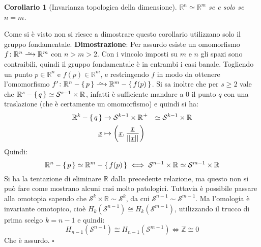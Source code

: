 \documentclass[10pt, twoside=false, x11names]{scrbook}
\newtheorem{corollary}[theorem]{Corollario}
\newenvironment{proof}{{\textbf{Dimostrazione}:}}{\hfill $\square$}
\newcommand{\Z}{\mathbb{Z}}
\newcommand{\RN}[1][]{\mathbb{R}^#1}
\newcommand{\Sph}[1][]{\mathcal{S}^#1}
\newcommand{\homoto}{\xrightarrow{\,\smash{\raisebox{-0.65ex}{\ensuremath{\scriptstyle\sim}}}\,}}
\renewcommand{\vec}[1]{\underline{#1}}
\let\setminus-
\begin{document}
\begin{corollary}[Invarianza topologica della dimensione]
  $ \RN{n} \simeq \RN{m} $ se e solo se $ n = m $.
\end{corollary}
Come si è visto non si riesce a dimostrare questo corollario
utilizzano solo il gruppo fondamentale.
\begin{proof}
  Per assurdo esiste un omomorfismo $ f \colon \RN{n} \homoto \RN{m} $ con $ n > m > 2 $.
  Con i vincolo imposti su $ m $ e $ n $ gli spazi sono contraibili, quindi il gruppo
  fondamentale è in entrambi i casi banale. Togliendo un punto $ p \in \RN{n} $ e
  $ f(p) \in \RN{m} $, e restringendo $ f $ in modo da ottenere l'omomorfismo
  $ f' \colon \RN{n} \setminus \set{p} \homoto \RN{m} \setminus \set{f(p)} $.
  Si sa inoltre che per $ s \geq 2 $ vale che $ \RN{s} \setminus \set{q} \simeq \Sph{s-1} \times \RN{} $,
  infatti è sufficiente mandare a $ 0 $ il punto $ q $ con una traslazione
  (che è certamente un omomorfismo) e quindi si ha:
  \[
    \begin{aligned}[t]
      \RN{k} \setminus \set{q} & \to  \Sph{k-1} \times {\RN{}}^+ & \simeq \Sph{k-1} \times \RN{} \\
      \vec{x} & \mapsto \left( \vec{x}, \frac{\vec{x}}{|| \vec{x} ||} \right) &
    \end{aligned}
  \]
  Quindi:
  \[
    \RN{n} \setminus \set{p} \simeq \RN{m} \setminus \set{f(p)} \iff \Sph{n-1} \times \RN{} \simeq \Sph{m-1} \times \RN{}
  \]
  Si ha la tentazione di eliminare $ \RN{} $ dalla precedente relazione, ma
  questo non si può fare come mostrano alcuni casi molto patologici.
  Tuttavia è possibile passare alla omotopia sapendo che $ \Sph{k} \times \RN{} \sim \Sph{k} $,
  da cui $ \Sph{n-1} \sim \Sph{m-1} $. Ma l'omologia è invariante omotopico, cioè
  $ H_k(\Sph{n-1}) \cong H_k(\Sph{m-1}) $, utilizzando il trucco di prima scelgo $ k = n-1 $
  e quindi:
  \[
    H_{n-1}(\Sph{n-1}) \cong H_{n-1}(\Sph{m-1}) \iff \Z \cong 0
  \]
  Che è assurdo.
\end{proof}
\end{document}

